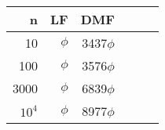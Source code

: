 

\begin{tabular}{r|rrrrr}
n &LF&DMF    \\ \hline
10    &$\phi$& 3437$\phi$    \\
100   &$\phi$ & 3576$\phi$         \\
             
3000  &$\phi$ &  6839$\phi$  \\
$10^4$&$\phi$ &  8977$\phi$\\

\end{tabular}